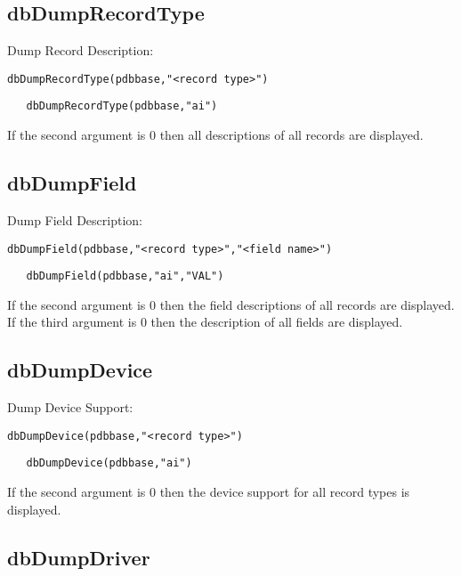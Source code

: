 \subsection{dbDumpRecordType}

Dump Record Description:

\begin{verbatim}dbDumpRecordType(pdbbase,"<record type>")
\end{verbatim}

\begin{verbatim}   dbDumpRecordType(pdbbase,"ai")
\end{verbatim}If the second argument is 0 then all descriptions of all records are displayed.

\subsection{dbDumpField}

Dump Field Description:

\begin{verbatim}dbDumpField(pdbbase,"<record type>","<field name>")
\end{verbatim}

\begin{verbatim}   dbDumpField(pdbbase,"ai","VAL")
\end{verbatim}If the second argument is 0 then the field descriptions of all records are displayed. If the third argument is 0 then the 
description of all fields are displayed.

\subsection{dbDumpDevice}

Dump Device Support:

\begin{verbatim}dbDumpDevice(pdbbase,"<record type>")
\end{verbatim}

\begin{verbatim}   dbDumpDevice(pdbbase,"ai")
\end{verbatim}If the second argument is 0 then the device support for all record types is displayed.

\subsection{dbDumpDriver}

